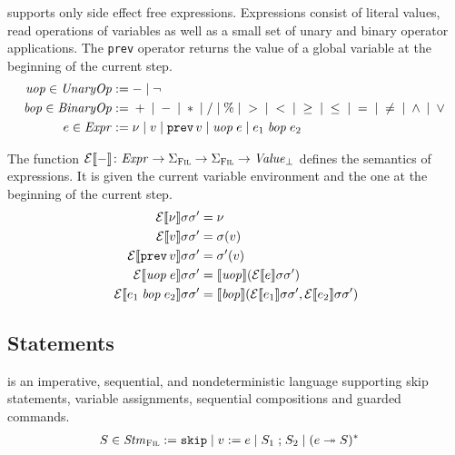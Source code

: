 \documentclass[a4paper,10pt,english]{article}
\begin{document}
\Fil supports only side effect free expressions. Expressions consist of literal values, read operations of variables as
well as a small set of unary and binary operator applications. The \texttt{prev} operator returns the value of a global
variable at the beginning of the current step.
\begin{align*}
	\mathit{uop} \in \mathit{UnaryOp} & := - \mid \neg
	\\
    \mathit{bop} \in \mathit{BinaryOp} & := {} + {} \mid {} - {} \mid {} \ast {} \mid {} / {}
                       \mid {} \% {} \mid {} > {} \mid {} < {} \mid {} \geq {} 
                       \mid {} \leq {} \mid {} = {} \mid {} \neq {} \mid {} \wedge {} \mid {} \vee {}
	\\
	e \in \mathit{Expr} & := 
		\nu \mid
		v \mid
		\mathtt{prev} \,v \mid
		\mathit{uop}\; e \mid
		e_1 \;\mathit{bop}\; e_2
\end{align*}

The function $\mathcal{E} \llbracket - \rrbracket \colon \mathit{Expr} \rightarrow \Sigma_\textsc{Fil} \rightarrow \Sigma_\textsc{Fil} \rightarrow \mathit{Value}_\bot$ defines the
semantics of expressions. It is given the current variable environment and the one at the beginning of the current step.
\begin{align*}
	\mathcal{E} \llbracket \nu \rrbracket \sigma \sigma' &= \nu \\
	\mathcal{E} \llbracket v \rrbracket \sigma \sigma' &= \sigma(v) \\
	\mathcal{E} \llbracket \mathtt{prev} \,v \rrbracket \sigma \sigma' &= \sigma'(v) \\
	\mathcal{E} \llbracket \mathit{uop}\; e \rrbracket \sigma \sigma' &= \llbracket \mathit{uop} \rrbracket (\mathcal{E} \llbracket e \rrbracket \sigma \sigma')
	\\
	\mathcal{E} \llbracket e_1 \;\mathit{bop}\; e_2 \rrbracket \sigma \sigma' &= \llbracket \mathit{bop} \rrbracket (\mathcal{E} \llbracket e_1 \rrbracket
	\sigma \sigma', \mathcal{E} \llbracket e_2 \rrbracket \sigma \sigma')
\end{align*}

\subsection{Statements}

\Fil is an imperative, sequential, and nondeterministic language supporting skip statements, variable assignments, sequential
compositions and guarded commands.
\begin{align*}
	S \in \mathit{Stm}_\textsc{Fil} & :=
		\mathtt{skip} \mid 
		v\; \mathtt{:=}\; e \mid 
		S_1 \; \mathtt{;} \; S_2 \mid
		(e \; \mathtt{\twoheadrightarrow} \; S)^*
\end{align*}
\end{document}
